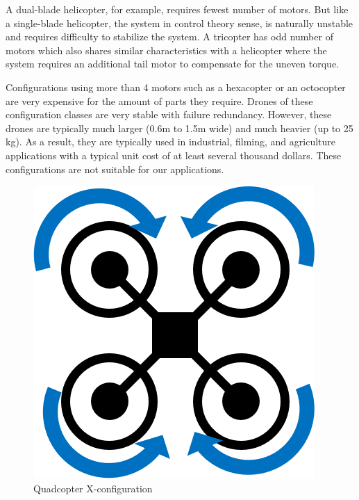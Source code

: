 A dual-blade helicopter, for example, requires fewest number of motors. But like a single-blade helicopter, the system in control theory sense, is naturally unstable and requires difficulty to stabilize the system. A tricopter has odd number of motors which also shares similar characteristics with a helicopter where the system requires an additional tail motor to compensate for the uneven torque. 

Configurations using more than 4 motors such as a hexacopter or an octocopter are very expensive for the amount of parts they require. Drones of these configuration classes are very stable with failure redundancy. However, these drones are typically much larger (0.6m to 1.5m wide) and much heavier (up to 25 kg). As a result, they are typically used in industrial, filming, and agriculture applications with a typical unit cost of at least several thousand dollars. These configurations are not suitable for our applications.

\begin{figure}[h]
	\centering
	\includegraphics[scale=0.4]{img/drone_xconfigt}
	\caption{Quadcopter X-configuration}
	\label{fig:quadcopter-x-t}
\end{figure}


